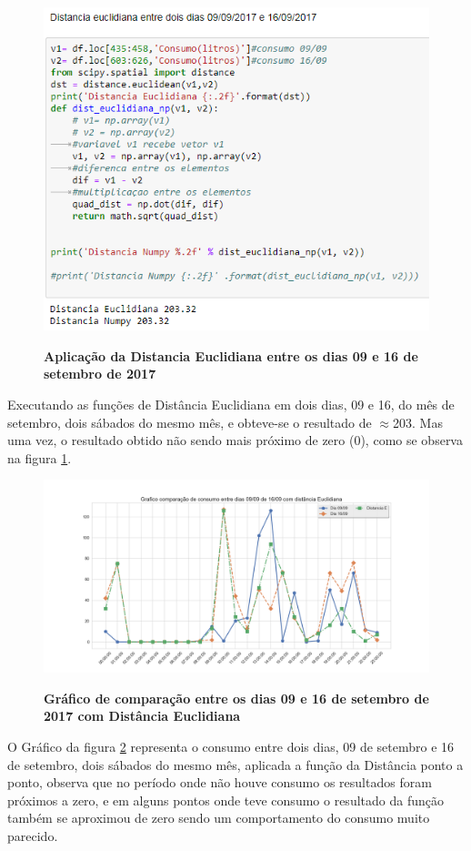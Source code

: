 \begin{figure}[ht]
	\caption{\textbf{Aplicação da Distancia Euclidiana entre os dias 09 e 16 de setembro de 2017}}
	\centering
		\includegraphics[scale=0.8 , keepaspectratio]{figuras/distanciaeuclidiana09-09-17e16-09-17}
		\label{dist_09e16_set_deta}
\end{figure}

\par Executando as funções de Distância Euclidiana em dois dias, 09 e 16, do mês de setembro, dois sábados do mesmo mês, e obteve-se o resultado de  $\approx $203. Mas uma vez, o resultado obtido não sendo mais próximo de zero (0), como se observa na figura \ref{dist_09e16_set_deta}. 

\begin{figure}[ht]
	\caption{\textbf{Gráfico de comparação entre os dias 09 e 16 de setembro de 2017 com Distância Euclidiana}}
	\centering
		\includegraphics[width=\textwidth,height=\textheight , keepaspectratio]{figuras/Comparacaodedias09-09e16-09comdistancia}
		\label{graf_dist_09e16_set_deta}
\end{figure}
\par O Gráfico da figura \ref{graf_dist_09e16_set_deta} representa o consumo entre dois dias, 09 de setembro e 16 de setembro, dois sábados do mesmo mês,  aplicada a função da Distância ponto a ponto, observa que no período onde não houve consumo os resultados foram próximos a zero, e em alguns pontos onde teve consumo o resultado da função também se aproximou de zero sendo um comportamento do consumo muito parecido.


